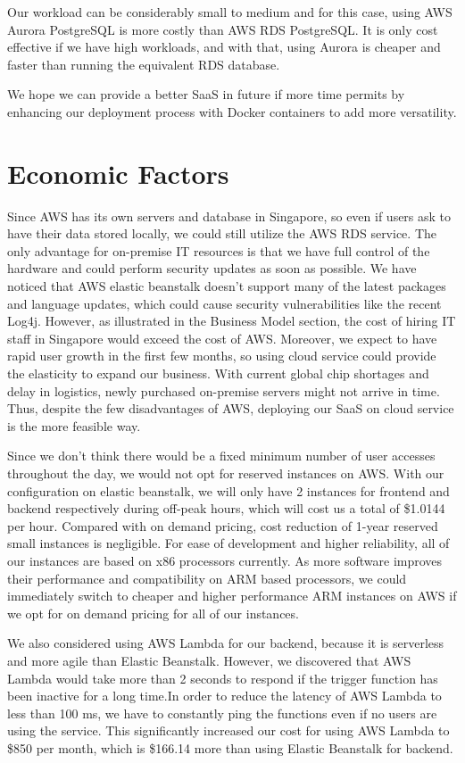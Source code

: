 \documentclass[a4paper]{article}
\begin{document}
        Our workload can be considerably small to medium and for this case, using AWS Aurora PostgreSQL is more costly than AWS RDS PostgreSQL. It is only cost effective if we have high workloads, and with that, using Aurora is cheaper and faster than running the equivalent RDS database.
        
        We hope we can provide a better SaaS in future if more time permits by enhancing our deployment process with Docker containers to add more versatility.

\section{Economic Factors}

Since AWS has its own servers and database in Singapore, so even if users ask to have their data stored locally, we could still utilize the AWS RDS service. The only advantage for on-premise IT resources is that we have full control of the hardware and could perform security updates as soon as possible. We have noticed that AWS elastic beanstalk doesn’t support many of the latest packages and language updates, which could cause security vulnerabilities like the recent Log4j. However, as illustrated in the Business Model section, the cost of hiring IT staff in Singapore would exceed the cost of AWS. Moreover, we expect to have rapid user growth in the first few months, so using cloud service could provide the elasticity to expand our business. With current global chip shortages and delay in logistics, newly purchased on-premise servers might not arrive in time. Thus, despite the few disadvantages of AWS, deploying our SaaS on cloud service is the more feasible way.

Since we don’t think there would be a fixed minimum number of user accesses throughout the day, we would not opt for reserved instances on AWS. With our configuration on elastic beanstalk, we will only have 2 instances for frontend and backend respectively during off-peak hours, which will cost us a total of \$1.0144 per hour. Compared with on demand pricing, cost reduction of 1-year reserved small instances is negligible. For ease of development and higher reliability, all of our instances are based on x86 processors currently. As more software improves their performance and compatibility on ARM based processors, we could immediately switch to cheaper and higher performance ARM instances on AWS if we opt for on demand pricing for all of our instances.

We also considered using AWS Lambda for our backend, because it is serverless and more agile than Elastic Beanstalk. However, we discovered that AWS Lambda would take more than 2 seconds to respond if the trigger function has been inactive for a long time.In order to reduce the latency of AWS Lambda to less than 100 ms, we have to constantly ping the functions even if no users are using the service. This significantly increased our cost for using AWS Lambda to \$850 per month, which is \$166.14 more than using Elastic Beanstalk for backend. 
\end{document}
